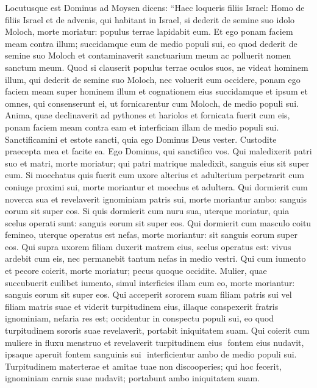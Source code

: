 \begin{biblechapter}  
\verse Locutusque est Dominus ad Moysen dicens: 
\verse “Haec loqueris filiis Israel: Homo de filiis Israel et de advenis, qui habitant in Israel, si dederit de semine suo idolo Moloch, morte moriatur: populus terrae lapidabit eum. 
\verse Et ego ponam faciem meam contra illum; succidamque eum de medio populi sui, eo quod dederit de semine suo Moloch et contaminaverit sanctuarium meum ac polluerit nomen sanctum meum. 
\verse Quod si clauserit populus terrae oculos suos, ne videat hominem illum, qui dederit de semine suo Moloch, nec voluerit eum occidere, 
\verse ponam ego faciem meam super hominem illum et cognationem eius succidamque et ipsum et omnes, qui consenserunt ei, ut fornicarentur cum Moloch, de medio populi sui. 
\verse Anima, quae declinaverit ad pythones et hariolos et fornicata fuerit cum eis, ponam faciem meam contra eam et interficiam illam de medio populi sui. 
\verse Sanctificamini et estote sancti, quia ego Dominus Deus vester. 
\verse Custodite praecepta mea et facite ea. Ego Dominus, qui sanctifico vos. 
\verse Qui maledixerit patri suo et matri, morte moriatur; qui patri matrique maledixit, sanguis eius sit super eum. 
\verse Si moechatus quis fuerit cum uxore alterius et adulterium perpetrarit cum coniuge proximi sui, morte moriantur et moechus et adultera. 
\verse Qui dormierit cum noverca sua et revelaverit ignominiam patris sui, morte moriantur ambo: sanguis eorum sit super eos. 
\verse Si quis dormierit cum nuru sua, uterque moriatur, quia scelus operati sunt: sanguis eorum sit super eos. 
\verse Qui dormierit cum masculo coitu femineo, uterque operatus est nefas, morte moriantur: sit sanguis eorum super eos. 
\verse Qui supra uxorem filiam duxerit matrem eius, scelus operatus est: vivus ardebit cum eis, nec permanebit tantum nefas in medio vestri. 
\verse Qui cum iumento et pecore coierit, morte moriatur; pecus quoque occidite.  
\verse Mulier, quae succubuerit cuilibet iumento, simul interficies illam cum eo, morte moriantur: sanguis eorum sit super eos. 
\verse Qui acceperit sororem suam filiam patris sui vel filiam matris suae et viderit turpitudinem eius, illaque conspexerit fratris ignominiam, nefaria res est; occidentur in conspectu populi sui, eo quod turpitudinem sororis suae revelaverit, portabit iniquitatem suam. 
\verse Qui coierit cum muliere in fluxu menstruo et revelaverit turpitudinem eius ­ fontem eius nudavit, ipsaque aperuit fontem sanguinis sui ­ interficientur ambo de medio populi sui. 
\verse Turpitudinem materterae et amitae tuae non discooperies; qui hoc fecerit, ignominiam carnis suae nudavit; portabunt ambo iniquitatem suam. 

\end{biblechapter}
